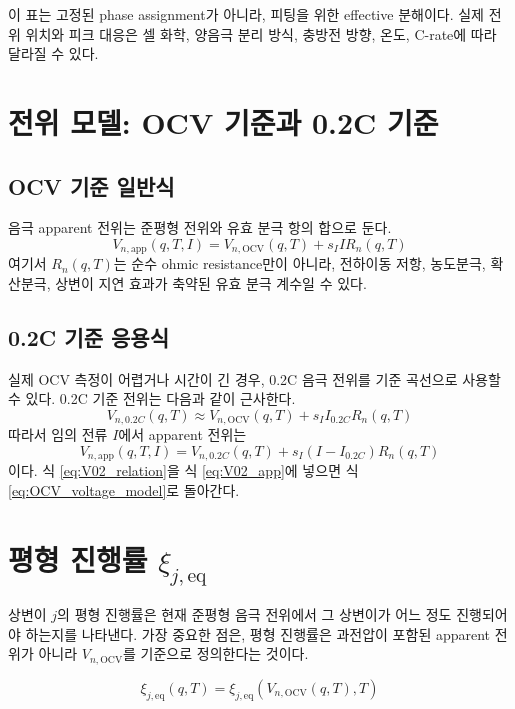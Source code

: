 \documentclass[11pt,a4paper]{article}
\newcommand{\OCV}{\mathrm{OCV}}
\newcommand{\app}{\mathrm{app}}
\newcommand{\eq}{\mathrm{eq}}
\begin{document}
이 표는 고정된 phase assignment가 아니라, 피팅을 위한 effective 분해이다. 실제 전위 위치와 피크 대응은 셀 화학, 양음극 분리 방식, 충방전 방향, 온도, C-rate에 따라 달라질 수 있다.

\section{전위 모델: OCV 기준과 0.2C 기준}
\subsection{OCV 기준 일반식}
음극 apparent 전위는 준평형 전위와 유효 분극 항의 합으로 둔다.
\begin{equation}
V_{n,\app}(q,T,I)=V_{n,\OCV}(q,T)+s_IIR_n(q,T)
\label{eq:OCV_voltage_model}
\end{equation}
여기서 \(R_n(q,T)\)는 순수 ohmic resistance만이 아니라, 전하이동 저항, 농도분극, 확산분극, 상변이 지연 효과가 축약된 유효 분극 계수일 수 있다.

\subsection{0.2C 기준 응용식}
실제 OCV 측정이 어렵거나 시간이 긴 경우, 0.2C 음극 전위를 기준 곡선으로 사용할 수 있다. 0.2C 기준 전위는 다음과 같이 근사한다.
\begin{equation}
V_{n,0.2C}(q,T)\approx V_{n,\OCV}(q,T)+s_II_{0.2C}R_n(q,T)
\label{eq:V02_relation}
\end{equation}
따라서 임의 전류 \(I\)에서 apparent 전위는
\begin{equation}
V_{n,\app}(q,T,I)=V_{n,0.2C}(q,T)+s_I\left(I-I_{0.2C}\right)R_n(q,T)
\label{eq:V02_app}
\end{equation}
이다. 식 \eqref{eq:V02_relation}을 식 \eqref{eq:V02_app}에 넣으면 식 \eqref{eq:OCV_voltage_model}로 돌아간다.

\section{평형 진행률 \texorpdfstring{\(\xi_{j,\eq}\)}{xi_eq}}
상변이 \(j\)의 평형 진행률은 현재 준평형 음극 전위에서 그 상변이가 어느 정도 진행되어야 하는지를 나타낸다. 가장 중요한 점은, 평형 진행률은 과전압이 포함된 apparent 전위가 아니라 \(V_{n,\OCV}\)를 기준으로 정의한다는 것이다.

\begin{equation}
\boxed{
\xi_{j,\eq}(q,T)=\xi_{j,\eq}\!\left(V_{n,\OCV}(q,T),T\right)
}
\label{eq:xi_eq_basis}
\end{equation}
\end{document}
